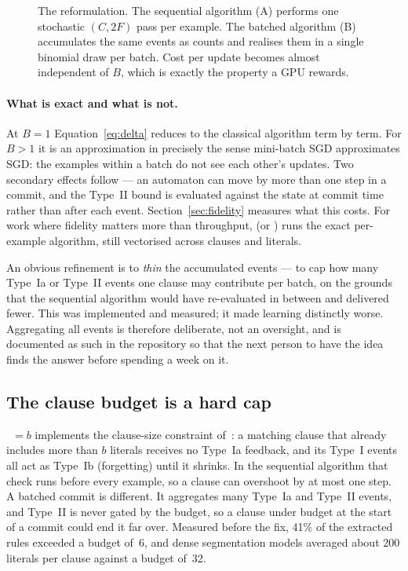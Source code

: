 \begin{figure}[htbp]
\centering
\resizebox{\linewidth}{!}{}
\caption{The reformulation. The sequential algorithm (A) performs one stochastic $(C,2F)$
  pass per example. The batched algorithm (B) accumulates the same events as counts and
  realises them in a single binomial draw per batch. Cost per update becomes almost
  independent of $B$, which is exactly the property a GPU rewards.}
\label{fig:batched}
\end{figure}

\paragraph{What is exact and what is not.}
At $B = 1$ Equation~\eqref{eq:delta} reduces to the classical algorithm term by term. For
$B > 1$ it is an approximation in precisely the sense mini-batch SGD approximates SGD: the
examples within a batch do not see each other's updates. Two secondary effects follow ---
an automaton can move by more than one step in a commit, and the Type~II bound is evaluated
against the state at commit time rather than after each event. Section~\ref{sec:fidelity}
measures what this costs. For work where fidelity matters more than throughput,
 (or ) runs the exact
per-example algorithm, still vectorised across clauses and literals.

\begin{ttcallout}
An obvious refinement is to \emph{thin} the accumulated events --- to cap how many Type~Ia or
Type~II events one clause may contribute per batch, on the grounds that the sequential
algorithm would have re-evaluated in between and delivered fewer. This was implemented and
measured; it made learning distinctly worse. Aggregating all events is therefore deliberate,
not an oversight, and is documented as such in the repository so that the next person to have
the idea finds the answer before spending a week on it.
\end{ttcallout}

\subsection{The clause budget is a hard cap}
\label{sec:budget}

~$=b$ implements the clause-size constraint of~: a
matching clause that already includes more than $b$ literals receives no Type~Ia feedback,
and its Type~I events all act as Type~Ib (forgetting) until it shrinks. In the sequential
algorithm that check runs before every example, so a clause can overshoot by at most one
step. A batched commit is different. It aggregates many Type~Ia and Type~II events, and
Type~II is never gated by the budget, so a clause under budget at the start of a commit could
end it far over. Measured before the fix, 41\% of the extracted rules exceeded a budget of~6,
and dense segmentation models averaged about 200 literals per clause against a budget of~32.

